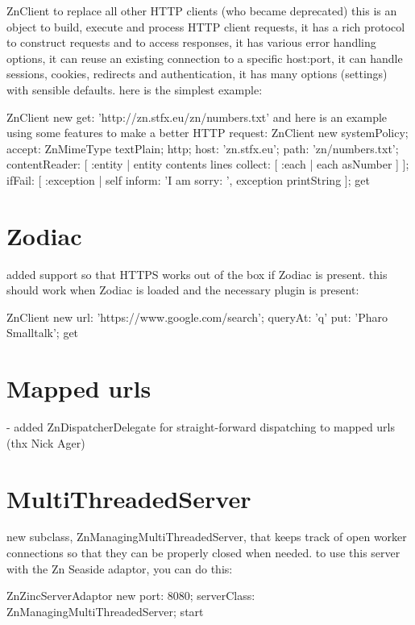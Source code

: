 \documentclass[a4paper,10pt,twoside]{book}
\begin{document}
 ZnClient to replace all other HTTP clients (who became deprecated) this is an object to build, execute and process HTTP client requests,
it has a rich protocol to construct requests and to access responses, it has various error handling options, it can reuse an existing connection to a specific host:port, it can handle sessions, cookies, redirects and authentication, it has many options (settings) with sensible defaults.
here is the simplest example:




\begin{code}
    ZnClient new
      get: 'http://zn.stfx.eu/zn/numbers.txt'
and here is an example using some features to make a better HTTP request:
    ZnClient new
      systemPolicy;
      accept: ZnMimeType textPlain;
      http;
      host: 'zn.stfx.eu';
      path: 'zn/numbers.txt';
      contentReader: [ :entity | entity contents lines collect: [ :each | each asNumber ] ];
      ifFail: [ :exception | self inform: 'I am sorry: ', exception printString ];
      get
\end{code}      


\section{Zodiac}      
 added support so that HTTPS works out of the box if Zodiac is present.
this should work when Zodiac is loaded and the necessary plugin is present:
\begin{code}
    ZnClient new
      url: 'https://www.google.com/search';
      queryAt: 'q' put: 'Pharo Smalltalk';
      get
\end{code}      
      

\section{Mapped urls}
- added ZnDispatcherDelegate for straight-forward dispatching to mapped urls (thx Nick Ager)


\section{MultiThreadedServer}      
new subclass, ZnManagingMultiThreadedServer, that keeps track of open
worker connections so that they can be properly closed when needed.
to use this server with the Zn Seaside adaptor, you can do this:

    ZnZincServerAdaptor new
      port: 8080;
      serverClass: ZnManagingMultiThreadedServer;
      start
      
\end{document}
